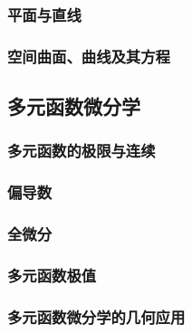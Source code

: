 \documentclass[
]{article}
\begin{document}
\hypertarget{ux5e73ux9762ux4e0eux76f4ux7ebf}{%
\subsubsection{平面与直线}\label{ux5e73ux9762ux4e0eux76f4ux7ebf}}

\hypertarget{ux7a7aux95f4ux66f2ux9762ux66f2ux7ebfux53caux5176ux65b9ux7a0b}{%
\subsubsection{空间曲面、曲线及其方程}\label{ux7a7aux95f4ux66f2ux9762ux66f2ux7ebfux53caux5176ux65b9ux7a0b}}

\hypertarget{ux591aux5143ux51fdux6570ux5faeux5206ux5b66}{%
\subsection{多元函数微分学}\label{ux591aux5143ux51fdux6570ux5faeux5206ux5b66}}

\hypertarget{ux591aux5143ux51fdux6570ux7684ux6781ux9650ux4e0eux8fdeux7eed}{%
\subsubsection{多元函数的极限与连续}\label{ux591aux5143ux51fdux6570ux7684ux6781ux9650ux4e0eux8fdeux7eed}}

\hypertarget{ux504fux5bfcux6570}{%
\subsubsection{偏导数}\label{ux504fux5bfcux6570}}

\hypertarget{ux5168ux5faeux5206}{%
\subsubsection{全微分}\label{ux5168ux5faeux5206}}

\hypertarget{ux591aux5143ux51fdux6570ux6781ux503c}{%
\subsubsection{多元函数极值}\label{ux591aux5143ux51fdux6570ux6781ux503c}}

\hypertarget{ux591aux5143ux51fdux6570ux5faeux5206ux5b66ux7684ux51e0ux4f55ux5e94ux7528}{%
\subsubsection{多元函数微分学的几何应用}\label{ux591aux5143ux51fdux6570ux5faeux5206ux5b66ux7684ux51e0ux4f55ux5e94ux7528}}
\end{document}
